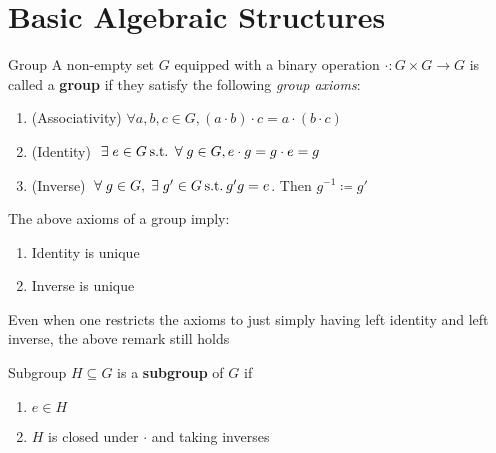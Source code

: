 \documentclass[a4paper, 10pt]{article}
\begin{document}
\section{Basic Algebraic Structures}
\begin{definition} {Group}
    A non-empty set \(G\) equipped with a binary operation \(\cdot: G \times G \to G\) is called a \textbf{group} if they satisfy the following \textit{group axioms}:

    \begin{enumerate}
        \item (Associativity) \(\forall a, b, c \in G, (a \cdot b) \cdot c = a \cdot (b \cdot c)\)
        \item (Identity) \(\exists e \in G \st \forall g \in G, e \cdot g = g \cdot e = g\)
        \item (Inverse) \(\forall g \in G, \exists g' \in G \st g'g = e\). Then \(g^{-1} \coloneqq g'\)
    \end{enumerate}
\end{definition}
\begin{remark}
    The above axioms of a group imply:

    \begin{enumerate}
        \item Identity is unique
        \item Inverse is unique
    \end{enumerate}

    Even when one restricts the axioms to just simply having left identity and left inverse, the above remark still holds
\end{remark}
\begin{definition} {Subgroup}
    \(H \subseteq G\) is a \textbf{subgroup} of \(G\) if

    \begin{enumerate}
        \item \(e \in H\)
        \item \(H\) is closed under \(\cdot\) and taking inverses
    \end{enumerate}
\end{definition}
\end{document}

